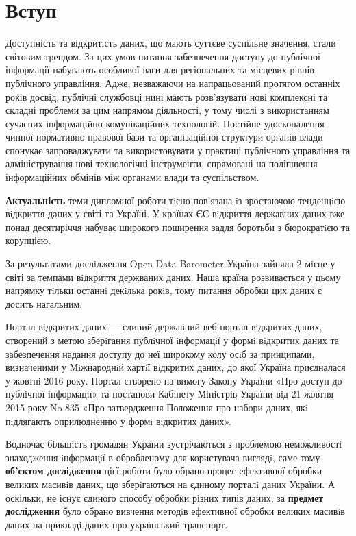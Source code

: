 \chapter*{Вступ}

Доступність та відкритість даних, що мають суттєве суспільне значення, стали світовим трендом.
За цих умов питання забезпечення доступу до публічної інформації набувають особливої ваги для регіональних та місцевих рівнів публічного управління.
Адже, незважаючи на напрацьований протягом останніх років досвід,
публічні службовці нині мають розв’язувати нові комплексні та складні проблеми за цим напрямом діяльності, у тому числі з
використанням сучасних інформаційно-комунікаційних технологій.
Постійне удосконалення чинної нормативно-правової бази та
організаційної структури органів влади спонукає запроваджувати та
використовувати у практиці публічного управління та адміністрування нові технологічні інструменти, спрямовані на поліпшення
інформаційних обмінів між органами влади та суспільством.

\textbf{Актуальнiсть} теми дипломної роботи тiсно пов’язана iз зростаючою
тенденцiєю вiдкриття даних у світі та Україні.
У країнах ЄС вiдкриття державних даних вже понад десятиріччя набуває широкого
поширення задля боротьби з бюрократiєю та корупцією.

За результатами дослiдження Open Data Barometer Україна зайняла 2 мiсце у світі     за темпами
вiдкриття держваних даних.
Наша країна розвивається у цьому напрямку тiльки останнi декiлька рокiв,
тому питання обробки цих даних є досить нагальним.

Портал вiдкритих даних — єдиний державний веб-портал вiдкритих даних,
створений з метою зберiгання публiчної iнформацiї у формi вiдкритих даних
та забезпечення надання доступу до неї широкому колу осiб за принципами,
визначеними у Мiжнароднiй хартiї вiдкритих даних, до якої Україна приєдналася
у жовтнi 2016 року. Портал створено на вимогу Закону України «Про доступ до
публiчної iнформацiї» та постанови Кабiнету Мiнiстрiв України вiд 21 жовтня
2015 року No 835 «Про затвердження Положення про набори даних,
якi пiдлягають оприлюдненню у формi вiдкритих даних».

Водночас бiльшiсть громадян України зустрiчаються з проблемою неможливостi
знаходження iнформацiї в обробленому для користувача виглядi, саме тому
\textbf{об'єктом дослідження} цієї роботи було обрано процес ефективної обробки
великих масивiв даних, що зберiгаються на єдиному порталi даних України.
А оскільки, не існує єдиного способу обробки різних типів даних, за
\textbf{предмет дослідження} було обрано  вивчення методiв ефективної обробки
великих масивiв даних на прикладi даних про український транспорт.

